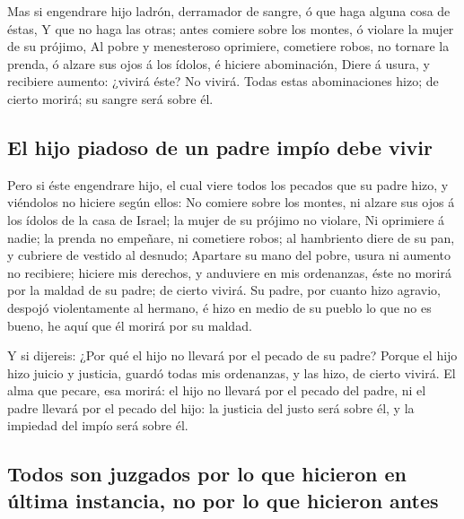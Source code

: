 Mas si engendrare hijo ladrón, derramador de sangre, ó
que haga alguna cosa de éstas,  Y que no haga las otras;
antes comiere sobre los montes, ó violare la mujer de su prójimo,
 Al pobre y menesteroso oprimiere, cometiere robos, no
tornare la prenda, ó alzare sus ojos á los ídolos, é hiciere
abominación,  Diere á usura, y recibiere aumento: ¿vivirá
éste? No vivirá. Todas estas abominaciones hizo; de cierto morirá; su
sangre será sobre él.

\hypertarget{el-hijo-piadoso-de-un-padre-impuxedo-debe-vivir}{%
\subsection{El hijo piadoso de un padre impío debe
vivir}\label{el-hijo-piadoso-de-un-padre-impuxedo-debe-vivir}}

 Pero si éste engendrare hijo, el cual viere todos los
pecados que su padre hizo, y viéndolos no hiciere según ellos:
 No comiere sobre los montes, ni alzare sus ojos á los
ídolos de la casa de Israel; la mujer de su prójimo no violare,
 Ni oprimiere á nadie; la prenda no empeñare, ni
cometiere robos; al hambriento diere de su pan, y cubriere de vestido al
desnudo;  Apartare su mano del pobre, usura ni aumento no
recibiere; hiciere mis derechos, y anduviere en mis ordenanzas, éste no
morirá por la maldad de su padre; de cierto vivirá.  Su
padre, por cuanto hizo agravio, despojó violentamente al hermano, é hizo
en medio de su pueblo lo que no es bueno, he aquí que él morirá por su
maldad.

 Y si dijereis: ¿Por qué el hijo no llevará por el pecado
de su padre? Porque el hijo hizo juicio y justicia, guardó todas mis
ordenanzas, y las hizo, de cierto vivirá.  El alma que
pecare, esa morirá: el hijo no llevará por el pecado del padre, ni el
padre llevará por el pecado del hijo: la justicia del justo será sobre
él, y la impiedad del impío será sobre él.

\hypertarget{todos-son-juzgados-por-lo-que-hicieron-en-uxfaltima-instancia-no-por-lo-que-hicieron-antes}{%
\subsection{Todos son juzgados por lo que hicieron en última instancia,
no por lo que hicieron
antes}\label{todos-son-juzgados-por-lo-que-hicieron-en-uxfaltima-instancia-no-por-lo-que-hicieron-antes}}

